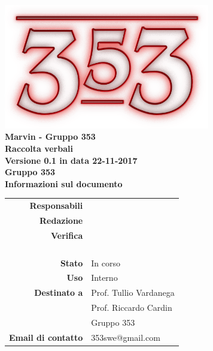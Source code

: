 \documentclass[openany, a4paper, 12pt]{report}
\begin{document}
\begin{titlepage}
	\centering
	\vfill
	{
		\bfseries
		\vskip2cm
		\includegraphics[width=9cm]{../../common/images/logo.png} \\
		\Large Marvin - Gruppo 353\\
		\vfill
		\Huge Raccolta verbali\\
		\Large Versione 0.1 in data 22-11-2017\\
		\vfill
		\large Gruppo 353\\
		\vfill
	\normalsize Informazioni sul documento\\
\begin{table}[htbp]
	\centering
	\renewcommand\arraystretch{1.2}
	\begin{tabular}{r|l}
		\hline
		\textbf{Responsabili}	& \Elena\\
		
		\textbf{Redazione} 		& \Mirco\\
		
		\textbf{Verifica} 		& \Parwinder\\
								& \Davide\\
								& \Gianluca\\
								& \Valentina\\
								& \Riccardo\\
						
		\textbf{Stato} 			& In corso\\
		\textbf{Uso}			& Interno\\
		\textbf{Destinato a}   	& Prof. Tullio Vardanega\\
								& Prof. Riccardo Cardin\\
								& Gruppo 353\\
		
						
		\textbf{Email di contatto}	& 353swe@gmail.com
	\end{tabular}
\end{table}
		\vfill
	}    
\end{titlepage}
\tableofcontents
\newpage
{}

 
\end{document}
